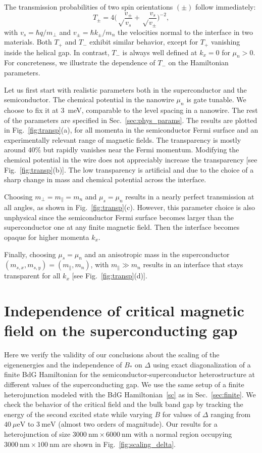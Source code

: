 \documentclass[twocolumn, notitlepage, 10pt, aps, floatfix, showpacs, prb, citeautoscript]{revtex4-1}
\begin{document}
The transmission probabilities of two spin orientations $(\pm)$ follow immediately:
\begin{equation}
T_\pm=4
\bigg(\sqrt\frac{v_\pm}{v_s}+\sqrt\frac{v_s}{v_\pm}\bigg)^{-2},
\end{equation}
with $v_s=\hbar q/m_\perp$ and $v_\pm=\hbar k_\pm/m_n$ the velocities normal to the interface in two materials.
Both $T_+$ and $T_-$ exhibit similar behavior, except for $T_+$ vanishing inside the helical gap.
In contrast, $T_-$ is always well defined at $k_x=0$ for $\mu_n>0$.
For concreteness, we illustrate the dependence of $T_-$ on the Hamiltonian parameters.

Let us first start with realistic parameters both in the superconductor and the semiconductor.
The chemical potential in the nanowire $\mu_n$ is gate tunable.
We choose to fix it at \SI{3}{\meV}, comparable to the level spacing in a nanowire.
The rest of the parameters are specified in Sec.~\ref{sec:phys_params}.
The results are plotted in Fig.~\ref{fig:transp}(a), for all momenta in the semiconductor Fermi surface and an experimentally relevant range of magnetic fields.
The transparency is mostly around $40\%$ but rapidly vanishes near the Fermi momentum.
Modifying the chemical potential in the wire does not appreciably increase the transparency [see Fig.~\ref{fig:transp}(b)].
The low transparency is artificial and due to the choice of a sharp change in mass and chemical potential across the interface.

Choosing $m_\perp = m_\parallel = m_n$ and $\mu_s = \mu_n$ results in a nearly perfect transmission at all angles, as shown in Fig.~\ref{fig:transp}(c).
However, this parameter choice is also unphysical since the semiconductor Fermi surface becomes larger than the superconductor one at any finite magnetic field.
Then the interface becomes opaque for higher momenta $k_x$.

Finally, choosing $\mu_s = \mu_n$ and an anisotropic mass in the superconductor $(m_{s,x},m_{s,y})=(m_\parallel, m_n)$, with $m_\parallel \gg m_n$ results in an interface that stays transparent for all $k_x$ [see Fig.~\ref{fig:transp}(d)].

\section{Independence of critical magnetic field on the superconducting gap}
\label{sec:app2}

Here we verify the validity of our conclusions about the scaling of the eigenenergies and the independence of $B_*$ on $\Delta$ using exact diagonalization of a finite BdG Hamiltonian for the semiconductor-superconductor heterostructure at different values of the superconducting gap.
We use the same setup of a finite heterojunction modeled with the BdG Hamiltonian~\eqref{sc} as in Sec.~\ref{sec:finite}.
We check the behavior of the critical field and the bulk band gap by tracking the energy of the second excited state while varying $B$ for values of $\Delta$ ranging from $\SI{40}{\mu\eV}$ to $\SI{3}{\meV}$ (almost two orders of magnitude).
Our results for a heterojunction of size $\SI{3000}{\nm}\times\SI{6000}{\nm}$ with a normal region occupying $\SI{3000}{\nm}\times\SI{100}{\nm}$ are shown in Fig.~\ref{fig:scaling_delta}.
\end{document}
